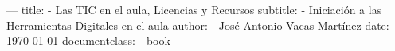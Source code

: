 ---
title:
  - Las TIC en el aula, Licencias y Recursos
subtitle:
  - Iniciación a las Herramientas Digitales en el aula
author:
   - José Antonio Vacas Martínez
date: \today
documentclass:
   - book
---
\graphicspath{ {images/} }


\dominitoc

\maketitle

\tableofcontents

\mainmatter
